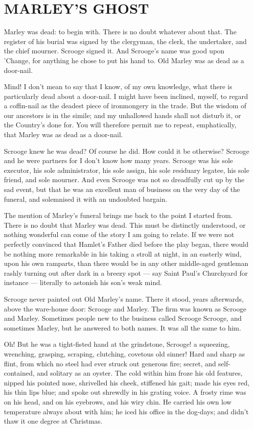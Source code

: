 \documentclass[11pt,twoside]{article}\makeatletter
\makeatletter
\renewcommand\section{\@startsection {section}{1}{\z@}%
     {-1.75ex \@plus -0.5ex \@minus -.2ex}%
     {0.5ex \@plus .2ex}%
     {\reset@font\Large\bfseries\sffamily}}
\def\DivI{\section}
\def\DivI{\chapter}
\makeatother
\begin{document}
\DivI[MARLEY'S GHOST]{MARLEY'S GHOST}\label{S1}\par
Marley was dead: to begin with.  There is no doubt whatever about that.  The register of his burial was signed by the clergyman, the clerk, the undertaker, and the chief mourner.  Scrooge signed it.  And Scrooge's name was good upon 'Change, for anything he chose to put his hand to.  Old Marley was as dead as a door-nail.  \par
Mind!  I don't mean to say that I know, of my own knowledge, what there is particularly dead about a door-nail. I might have been inclined, myself, to regard a coffin-nail as the deadest piece of ironmongery in the trade.  But the wisdom of our ancestors is in the simile; and my unhallowed  hands shall not disturb it, or the Country's done for.  You will therefore permit me to repeat, emphatically, that Marley was as dead as a door-nail.  \par
Scrooge knew he was dead?  Of course he did.  How could it be otherwise?  Scrooge and he were partners for I don't know how many years.  Scrooge was his sole executor, his sole administrator, his sole assign, his sole residuary legatee, his sole friend, and sole mourner.  And even Scrooge was not so dreadfully cut up by the sad event, but that he was an excellent man of business on the very day of the funeral, and solemnised it with an undoubted bargain.  \par
The mention of Marley's funeral brings me back to the point I started from.  There is no doubt that Marley was dead.  This must be distinctly understood, or nothing wonderful can come of the story I am going to relate.  If we were not perfectly convinced that Hamlet's Father died before the play began, there would be nothing more remarkable in his taking a stroll at night, in an easterly wind, upon his own ramparts, than there   would be in any other middle-aged gentleman rashly  turning out after dark in a breezy spot — say Saint  Paul's Churchyard for instance — literally to astonish his son's weak mind.  \par
Scrooge never painted out Old Marley's name.  There it stood, years afterwards, above the ware-house door: Scrooge and Marley.  The firm was known as Scrooge and Marley. Sometimes people new to the business called Scrooge Scrooge, and sometimes Marley, but he answered to both names.  It was all the same to him.  \par
Oh!  But he was a tight-fisted hand at the grindstone, Scrooge!  a squeezing, wrenching, grasping, scraping, clutching, covetous old sinner!  Hard and sharp as flint, from which no steel had ever struck out generous fire; secret, and self-contained, and solitary as an oyster.  The cold within him froze his old features, nipped his pointed nose, shrivelled his cheek, stiffened his gait; made his eyes red, his thin lips blue; and spoke out shrewdly in his grating voice.  A frosty rime was on his head, and on his eyebrows, and his wiry chin. He   carried his own low temperature always about with him; he iced his office in the dog-days; and didn't thaw it one degree at Christmas.  \par
\end{document}
